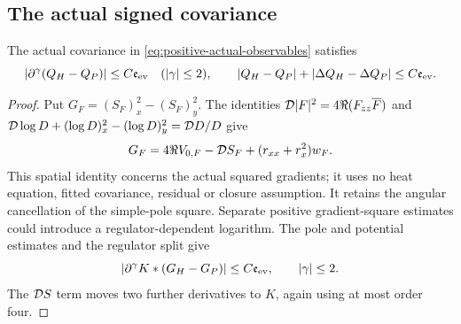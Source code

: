 \subsection{The actual signed covariance}
\begin{proposition}
\label{prop:positive-actual-covariance}
The actual covariance in \eqref{eq:positive-actual-observables} satisfies
\begin{equation}
 |\partial^\gamma(Q_H-Q_P)|\le C\mathfrak e_{\rm ev}
 \quad(|\gamma|\le2),\qquad
 |Q_H-Q_P|+|\Delta Q_H-\Delta Q_P|\le C\mathfrak e_{\rm ev}.
 \label{eq:positive-covariance-bound}
\end{equation}
\end{proposition}
\begin{proof}
Put $G_F=(S_F)_x^2-(S_F)_y^2$. The identities
$\mathcal D|F|^2=4\Re(F_{zz}\overline F)$ and
$\mathcal D\log D+(\log D)_x^2-(\log D)_y^2=\mathcal D D/D$ give
\begin{equation}
 G_F=4\Re V_{0,F}-\mathcal D S_F+(r_{xx}+r_x^2)w_F.
 \label{eq:positive-signed-stress}
\end{equation}
This spatial identity concerns the actual squared gradients; it uses
no heat equation, fitted covariance, residual or closure assumption.
It retains the angular cancellation of the simple-pole square.
Separate positive gradient-square estimates could introduce a
regulator-dependent logarithm.
The pole and potential estimates and the regulator split give
\begin{equation}
 |\partial^\gamma K*(G_H-G_P)|\le C\mathfrak e_{\rm ev},
 \qquad |\gamma|\le2.
 \label{eq:positive-stress-bound}
\end{equation}
The $\mathcal D S$ term moves two further derivatives to $K$, again using
at most order four.


\end{proof}
